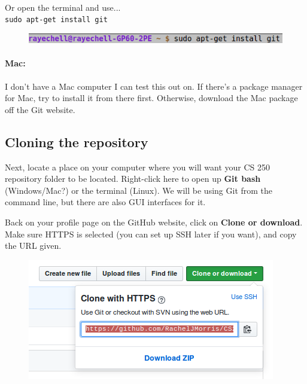 \documentclass[a4paper,12pt,oneside]{book}
\begin{document}
            ~\\
            Or open the terminal and use... \\
            \texttt{sudo apt-get install git}

                \begin{figure}[h]
                    \centering
                    \includegraphics[width=14cm]{images/git-commandline-install.png}
                \end{figure}
            
        \paragraph{Mac:}

            I don't have a Mac computer I can test this out on. If there's
            a package manager for Mac, try to install it from there first.
            Otherwise, download the Mac package off the Git website.

        \subsection{Cloning the repository}

            Next, locate a place on your computer where you will want
            your CS 250 repository folder to be located.
            Right-click here to open up \textbf{Git bash} (Windows/Mac?)
            or the terminal (Linux). We will be using Git from the command
            line, but there are also GUI interfaces for it.

            Back on your profile page on the GitHub website, click on
            \textbf{Clone or download}. Make sure HTTPS is selected (you
            can set up SSH later if you want), and copy the URL given.

                \begin{figure}[h]
                    \centering
                    \includegraphics{images/git-cloneurl.png}
                \end{figure}
\end{document}
